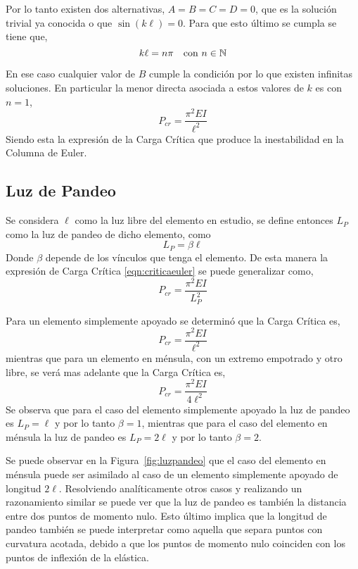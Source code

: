 Por lo tanto existen dos alternativas, $A = B = C = D = 0$, que es la solución trivial ya conocida o que $\sin(k\ell) = 0$.
Para que esto último se cumpla se tiene que,
\begin{equation}
k \ell = n \pi  \quad \text{con} \,\, n\in {\mathbb N}
\end{equation}

En ese caso cualquier valor de $B$ cumple la condición por lo que existen infinitas soluciones. En particular la menor directa asociada a estos valores de $k$ es con $n=1$,
\begin{equation}\label{eqn:criticaeuler}
\boxed{P_{cr} = \frac{\pi^2 E I}{\ell^2}}
\end{equation}
Siendo esta la expresión de la Carga Crítica que produce la inestabilidad en la Columna de Euler.

\subsection{Luz de Pandeo}

Se considera $\ell$ como la luz libre del elemento en estudio, se define entonces $L_P$ como la luz de pandeo de dicho elemento, como
\begin{equation}
L_P=\beta\ell
\end{equation}
Donde $\beta$ depende de los vínculos que tenga el elemento. De esta manera la expresión de Carga Crítica \eqref{eqn:criticaeuler} se puede generalizar como,
\begin{equation}\label{eqn:criticageneral}
\boxed{P_{cr} = \frac{\pi^2 E I}{L_P^2}}
\end{equation}

Para un elemento simplemente apoyado se determinó que la Carga Crítica es,
$$P_{cr} = \frac{\pi^2 E I}{\ell^2}$$
mientras que para un elemento en ménsula, con un extremo empotrado y otro libre, se verá mas adelante que la Carga Crítica es,
$$P_{cr} = \frac{\pi^2 E I}{4\ell^2}$$
Se observa que para el caso del elemento simplemente apoyado la luz de pandeo es $L_P=\ell$ y por lo tanto $\beta=1$, mientras que para el caso del elemento en ménsula la luz de pandeo es $L_P=2\ell$ y por lo tanto $\beta=2$. 

Se puede observar en la Figura~\ref{fig:luzpandeo} que el caso del elemento en ménsula puede ser asimilado al caso de un elemento simplemente apoyado de longitud $2\ell$. Resolviendo analíticamente otros casos y realizando un razonamiento similar se puede ver que la luz de pandeo es también la distancia entre dos puntos de momento nulo. Esto último implica que la longitud de pandeo también se puede interpretar como aquella que separa puntos con curvatura acotada, debido a que los puntos de momento nulo coinciden con los puntos de inflexión de la elástica.

